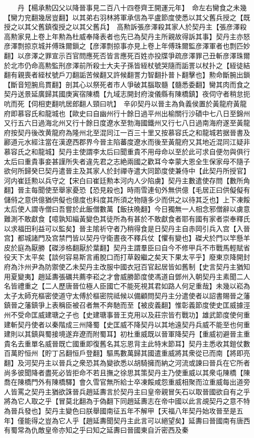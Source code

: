 　　丹【楊承勲囚父以降晉事見二百八十四卷齊王開運元年】　命左右臠食之未幾【臠力兖翻幾居豈翻】以其弟右羽林將軍承信為平盧節度使悉以其父舊兵授之【既授之以其父舊鎮復授之以其父舊兵】　高勲訴張彦澤殺其家人於契丹主【張彦澤殺高勲家見上卷上年勲為杜威奉降表者也先已為契丹主所親故得訴其事】契丹主亦怒彦澤剽掠京城并傅珠爾鎻之【彦澤剽掠事亦見上卷上年傅珠爾監彦澤軍者也剽匹妙翻】以彦澤之罪宣示百官問應死否皆言應死百姓亦投牒爭疏彦澤罪己丑斬彦澤珠爾於北市仍命高勲監刑彦澤前所殺士大夫子孫皆絰杖號哭隨而詬詈以杖扑之【絰徒結翻有親喪者絰杖號戶刀翻詬苦候翻又許候翻詈力智翻扑普卜翻擊也】勲命斷腕出鎖【斷音短腕烏貫翻】剖其心以祭死者市人爭破其腦取髓【髓悉委翻】臠其肉而食之　契丹送景延廣歸其國庚寅宿陳橋【九域志開封府浚儀縣有陳橋鎮】夜伺守者稍怠扼吭而死【伺相吏翻吭居郎翻人頸曰吭】　辛卯契丹以晉主為負義侯置於黃龍府黃龍府即慕容氏和龍城也【歐史曰自幽州行十餘日過平州出榆關行沙磧中七八日至錦州又行五六日過海北州又行十餘日度遼水至勃海國鐵州又行七八日過南海府遂至黃龍府按契丹後改黄龍府為隆州北至混同江一百三十里又按慕容氏之和龍城若据晉書及酈道元水經注當在漢遼西郡界今晉主陷蕃度遼水而後至黃龍府又其地近混同江疑非慕容氏之和龍城】契丹主使謂李太后曰聞重貴不用母命以至於此可求自便勿與俱行太后曰重貴事妾甚謹所失者違先君之志絶兩國之歡耳今幸蒙大恩全生保家母不隨子欲何所歸癸巳契丹遣晉主及其家人於封禪寺遣大同節度使兼侍中【此契丹所授官】河内崔廷勲以兵守之【宋白曰崔廷勲本河内人少陷虜】契丹主數遣使存問【數所角翻】晉主每聞使至舉家憂恐【恐見殺也】時雨雪連旬外無供億【毛居正曰供儗儗有儲偫之意供億猶供儗也億度也料度其所須之物隨多少而供之以待其乏也】上下凍餒太后使人謂寺僧曰吾嘗於此飯僧數萬【飯扶晩翻】今日獨無一人相念邪僧辭以虜意難測不敢獻食【噫孰知緇黃變色其徒所為有甚於不敢獻食者耶有國有家者崇奉釋氏以求福田利益可以監矣】晉主隂祈守者乃稍得食是日契丹主自赤岡引兵入宫【入晉宫】都城諸門及宫禁門皆以契丹守衛晝夜不釋兵仗【懼有變也】磔犬於門以竿懸羊皮於庭為厭勝【磔涉格翻厭於葉翻】契丹主謂羣臣曰自今不修甲兵不市戰馬輕賦省役天下太平矣【談何容易斯言甫脫口而打草穀繼之矣天下果太平乎】廢東京降開封府為汴州尹為防禦使乙未契丹主改服中國衣冠百官起居皆如舊制【史言契丹主猶知用夏變夷】趙延夀張礪共薦李崧之才會威勝節度使馮道自鄧州入朝契丹主素聞二人名皆禮重之【二人歷唐晉位極人臣國亡不能死視其君如路人何足重哉】未幾以崧為太子太師充樞密使道守太傅於樞密院祗候以備顧問契丹主分遣使者以詔書賜晉之藩鎮晉之藩鎮爭上表稱臣被召者無不奔馳而至【被皮義翻】惟彰義節度使史匡威據涇州不受命匡威建瑭之子也【史建瑭事晉王克用以及莊宗皆冇戰功】雄武節度使何重建斬契丹使者以秦階成三州降蜀【史匡威不降契丹以其地遠契丹兵威不能至也何重建則以其鎮與蜀接境遂弃遼而附蜀耳】初杜重威既以晉軍降契丹【重威初避晉主重貴名去重單名威晉既亡國重即復舊名其忘恩背主此特末節耳】契丹主悉收其鎧仗數百萬貯恒州【貯丁呂翻恒戶登翻】驅馬數萬歸其國遣重威將其衆從已而南【將即亮翻】及河契丹主以晉兵之衆恐其為變欲悉以胡騎擁而納之河流或諫曰晉兵在它所者尚多彼聞降者盡死必皆拒命不若且撫之徐思其策契丹主乃使重威以其衆屯陳橋【陳喬在陳橋門外有陳橋驛】會久雪官無所給士卒凍餒咸怨重威相聚而泣重威每出道旁人皆罵之契丹主猶欲誅晉兵趙延夀言於契丹主曰皇帝親冒矢石以取晉國欲自有之乎將為它人取之乎【冒莫北翻為于偽翻下同趙延夀志在帝中國以此言覘契丹之意不特為晉兵發也】契丹主變色曰朕舉國南征五年不解甲【天福八年契丹始攻晉至是五年】僅能得之豈為它人乎【趙延夀聞契丹主此言可以絕望矣】延夀曰晉國南有唐西有蜀常為仇敵皇帝亦知之乎曰知之延夀曰晉國東自沂密西及秦